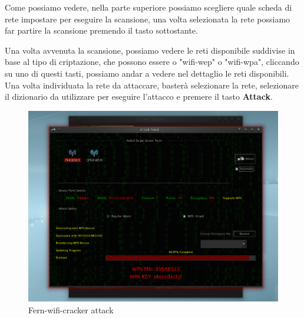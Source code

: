 Come possiamo vedere, nella parte superiore possiamo scegliere quale scheda di rete impostare per eseguire la scansione, una volta selezionata la rete possiamo far partire la scansione premendo il tasto sottostante.
\newpage

Una volta avvenuta la scansione, possiamo vedere le reti disponibile suddivise in base al tipo di criptazione, che possono essere o "wifi-wep" o "wifi-wpa", cliccando su uno di questi tasti, possiamo andar a vedere nel dettaglio le reti disponibili. Una volta individuata la rete da attaccare, basterà selezionare la rete, selezionare il dizionario da utilizzare per eseguire l'attacco e premere il tasto \textbf{Attack}.

\begin{figure}[ht]
    \centering
    \includegraphics[width=\linewidth]{Immagini/6/fern_3.jpg}
    \caption{Fern-wifi-cracker attack}
    \label{fig:Fern example}
\end{figure}

\label{chap:conc}
